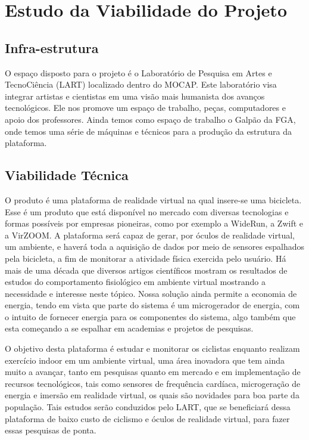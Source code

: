 
\section{Estudo da Viabilidade do Projeto}

\subsection{Infra-estrutura}

	O espaço disposto para o projeto é o Laboratório de Pesquisa em Artes e TecnoCiência (LART) localizado dentro do MOCAP. Este laboratório visa integrar artistas e cientistas em uma visão mais humanista dos avanços tecnológicos.
Ele nos promove um espaço de trabalho, peças, computadores e apoio dos professores.
Ainda temos como espaço de trabalho o Galpão da FGA, onde temos uma série de máquinas e técnicos para a produção da estrutura da plataforma.

\subsection{Viabilidade Técnica}
	
	O produto é uma plataforma de realidade virtual na qual insere-se uma bicicleta. Esse é um produto que está disponível no mercado com diversas tecnologias e formas possíveis por empresas pioneiras, como por exemplo a WideRun, a Zwift e a VirZOOM. A plataforma será capaz de gerar, por óculos de realidade virtual, um ambiente, e haverá toda a aquisição de dados por meio de sensores espalhados pela bicicleta, a fim de monitorar a atividade física exercida pelo usuário. Há mais de uma década que diversos artigos científicos mostram os resultados de estudos do comportamento fisiológico em ambiente virtual \cite{plante} \cite{mestre} \cite{chihak} mostrando a necessidade e interesse neste tópico. Nossa solução ainda permite a economia de energia, tendo em vista que parte do sistema é um microgerador de energia, com o intuito de fornecer energia para os componentes do sistema, algo também que esta começando a se espalhar em academias e projetos de pesquisas.
    	
	O objetivo desta plataforma é estudar e monitorar os ciclistas enquanto realizam exercício indoor em um ambiente virtual, uma área inovadora que tem ainda muito a avançar, tanto em pesquisas quanto em mercado e em implementação de recursos tecnológicos, tais como sensores de frequência cardíaca, microgeração de energia e imersão em realidade virtual, os quais são novidades para boa parte da população. Tais estudos serão conduzidos pelo LART, que se beneficiará dessa plataforma de baixo custo de ciclismo e óculos de realidade virtual, para fazer essas pesquisas de ponta.


